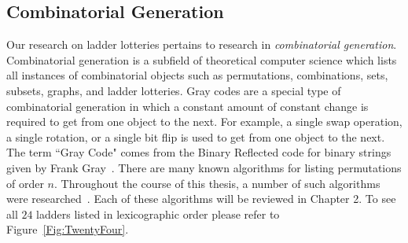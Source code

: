 \subsection{Combinatorial Generation}
Our research on ladder lotteries pertains to research in \emph{combinatorial generation}. Combinatorial 
generation is a subfield of theoretical computer science which lists all instances of  
combinatorial objects such as permutations, combinations, sets, subsets, graphs, and ladder lotteries. Gray codes are a 
special type of combinatorial generation in which a constant amount of constant change 
is required to get from one object to the next. For example, a single swap operation,
a single rotation, or a single bit flip is used to get from one object to the next. The term
``Gray Code" comes from the Binary Reflected code for binary strings given by Frank Gray~\cite{A39}.
There are many known algorithms for listing permutations of order $n$. Throughout the course of this thesis,
a number of such algorithms were researched~\cite{A18,A19,A21,A24,A25,A26,A31,A34,A35,A36,A37}.
Each of these algorithms will be reviewed in Chapter 2. 
To see all $24$ ladders listed in lexicographic order please refer to Figure~\ref{Fig:TwentyFour}.
